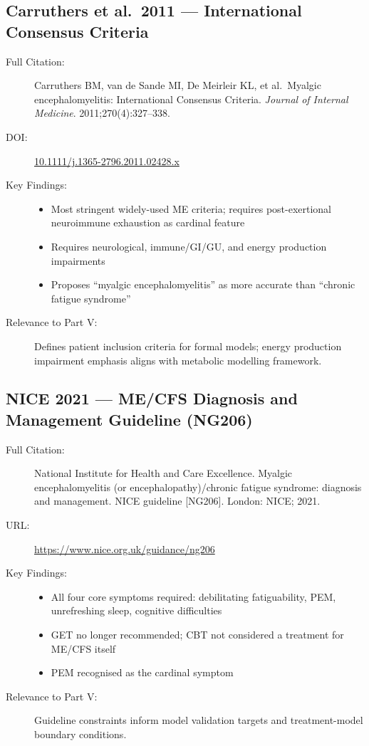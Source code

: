 \subsection{Carruthers et al.\ 2011 --- International Consensus Criteria}

\begin{description}
    \item[Full Citation:] Carruthers BM, van de Sande MI, De Meirleir KL, et al.\ Myalgic encephalomyelitis: International Consensus Criteria. \textit{Journal of Internal Medicine}. 2011;270(4):327--338. \cite{Carruthers2011ICC}
    \item[DOI:] \href{https://doi.org/10.1111/j.1365-2796.2011.02428.x}{10.1111/j.1365-2796.2011.02428.x}
    \item[Key Findings:]
    \begin{itemize}
        \item Most stringent widely-used ME criteria; requires post-exertional neuroimmune exhaustion as cardinal feature
        \item Requires neurological, immune/GI/GU, and energy production impairments
        \item Proposes ``myalgic encephalomyelitis'' as more accurate than ``chronic fatigue syndrome''
    \end{itemize}
    \item[Relevance to Part V:] Defines patient inclusion criteria for formal models; energy production impairment emphasis aligns with metabolic modelling framework.
\end{description}

\subsection{NICE 2021 --- ME/CFS Diagnosis and Management Guideline (NG206)}

\begin{description}
    \item[Full Citation:] National Institute for Health and Care Excellence. Myalgic encephalomyelitis (or encephalopathy)/chronic fatigue syndrome: diagnosis and management. NICE guideline [NG206]. London: NICE; 2021. \cite{NICE2021mecfs}
    \item[URL:] \url{https://www.nice.org.uk/guidance/ng206}
    \item[Key Findings:]
    \begin{itemize}
        \item All four core symptoms required: debilitating fatiguability, PEM, unrefreshing sleep, cognitive difficulties
        \item GET no longer recommended; CBT not considered a treatment for ME/CFS itself
        \item PEM recognised as the cardinal symptom
    \end{itemize}
    \item[Relevance to Part V:] Guideline constraints inform model validation targets and treatment-model boundary conditions.
\end{description}

